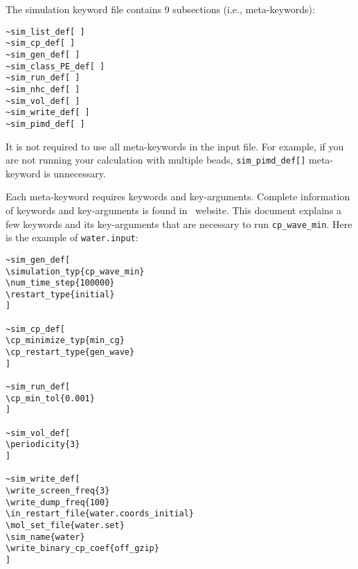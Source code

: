 The simulation keyword file contains 9 subsections (i.e., meta-keywords):
\begin{verbatim}
~sim_list_def[ ]
~sim_cp_def[ ]
~sim_gen_def[ ]
~sim_class_PE_def[ ]
~sim_run_def[ ]
~sim_nhc_def[ ]
~sim_vol_def[ ]
~sim_write_def[ ]
~sim_pimd_def[ ]
\end{verbatim}

It is not required to use all meta-keywords in the input file. For example, if you are not running your calculation with multiple beads, \verb+sim_pimd_def[]+ meta-keyword is unnecessary. 

Each meta-keyword requires keywords and key-arguments. Complete information of keywords and key-arguments is found in \openatom \ website. This document explains a few keywords and its key-arguments that are necessary to run \verb+cp_wave_min+.
Here is the example of \verb+water.input+:

\begin{verbatim}
~sim_gen_def[
\simulation_typ{cp_wave_min}
\num_time_step{100000}
\restart_type{initial}
]
 
~sim_cp_def[
\cp_minimize_typ{min_cg}
\cp_restart_type{gen_wave}
]

~sim_run_def[
\cp_min_tol{0.001}
]

~sim_vol_def[
\periodicity{3}
]

~sim_write_def[
\write_screen_freq{3}
\write_dump_freq{100}
\in_restart_file{water.coords_initial}
\mol_set_file{water.set}
\sim_name{water}
\write_binary_cp_coef{off_gzip}
]
\end{verbatim}

